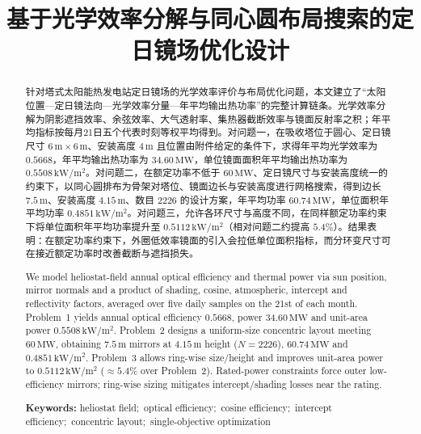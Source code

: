 \documentclass[withoutpreface,bwprint]{cumcmthesis}
\title{基于光学效率分解与同心圆布局搜索的定日镜场优化设计}
\begin{document}
\maketitle

\begin{abstract}
针对塔式太阳能热发电站定日镜场的光学效率评价与布局优化问题，本文建立了“太阳位置—定日镜法向—光学效率分量—年平均输出热功率”的完整计算链条。光学效率分解为阴影遮挡效率、余弦效率、大气透射率、集热器截断效率与镜面反射率之积；年平均指标按每月21日五个代表时刻等权平均得到。对问题一，在吸收塔位于圆心、定日镜尺寸 $6\,\mathrm{m}\times6\,\mathrm{m}$、安装高度 $4\,\mathrm{m}$ 且位置由附件给定的条件下，求得年平均光学效率为 $0.5668$，年平均输出热功率为 $34.60\,\mathrm{MW}$，单位镜面面积年平均输出热功率为 $0.5508\,\mathrm{kW/m^2}$。对问题二，在额定功率不低于 $60\,\mathrm{MW}$、定日镜尺寸与安装高度统一的约束下，以同心圆排布为骨架对塔位、镜面边长与安装高度进行网格搜索，得到边长 $7.5\,\mathrm{m}$、安装高度 $4.15\,\mathrm{m}$、数目 $2226$ 的设计方案，年平均功率 $60.74\,\mathrm{MW}$，单位面积年平均功率 $0.4851\,\mathrm{kW/m^2}$。对问题三，允许各环尺寸与高度不同，在同样额定功率约束下将单位面积年平均功率提升至 $0.5112\,\mathrm{kW/m^2}$（相对问题二约提高 $5.4\%$）。结果表明：在额定功率约束下，外圈低效率镜面的引入会拉低单位面积指标，而分环变尺寸可在接近额定功率时改善截断与遮挡损失。

\end{abstract}

\renewcommand{\abstractname}{Abstract}
\begin{abstract}
We model heliostat-field annual optical efficiency and thermal power via sun position, mirror normals and a product of shading, cosine, atmospheric, intercept and reflectivity factors, averaged over five daily samples on the 21st of each month. Problem~1 yields annual optical efficiency $0.5668$, power $34.60\,\mathrm{MW}$ and unit-area power $0.5508\,\mathrm{kW/m^2}$. Problem~2 designs a uniform-size concentric layout meeting $60\,\mathrm{MW}$, obtaining $7.5\,\mathrm{m}$ mirrors at $4.15\,\mathrm{m}$ height ($N=2226$), $60.74\,\mathrm{MW}$ and $0.4851\,\mathrm{kW/m^2}$. Problem~3 allows ring-wise size/height and improves unit-area power to $0.5112\,\mathrm{kW/m^2}$ ($\approx5.4\%$ over Problem~2). Rated-power constraints force outer low-efficiency mirrors; ring-wise sizing mitigates intercept/shading losses near the rating.

\noindent\textbf{Keywords:} heliostat field;\ optical efficiency;\ cosine efficiency;\ intercept efficiency;\ concentric layout;\ single-objective optimization
\end{abstract}
\renewcommand{\abstractname}{摘要}
\end{document}
